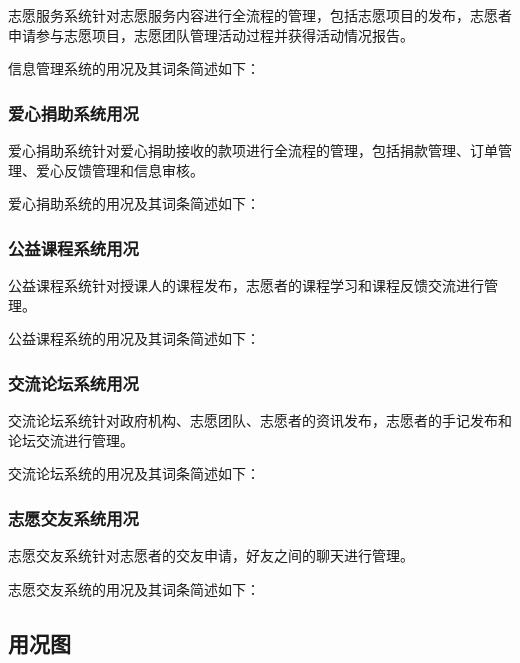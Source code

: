 志愿服务系统针对志愿服务内容进行全流程的管理，包括志愿项目的发布，志愿者申请参与志愿项目，志愿团队管理活动过程并获得活动情况报告。

信息管理系统的用况及其词条简述如下：



\subsubsection{爱心捐助系统用况}

爱心捐助系统针对爱心捐助接收的款项进行全流程的管理，包括捐款管理、订单管理、爱心反馈管理和信息审核。

爱心捐助系统的用况及其词条简述如下：


\subsubsection{公益课程系统用况}

公益课程系统针对授课人的课程发布，志愿者的课程学习和课程反馈交流进行管理。

公益课程系统的用况及其词条简述如下：


\subsubsection{交流论坛系统用况}

交流论坛系统针对政府机构、志愿团队、志愿者的资讯发布，志愿者的手记发布和论坛交流进行管理。

交流论坛系统的用况及其词条简述如下：


\subsubsection{志愿交友系统用况}

志愿交友系统针对志愿者的交友申请，好友之间的聊天进行管理。

志愿交友系统的用况及其词条简述如下：




\subsection{用况图}

